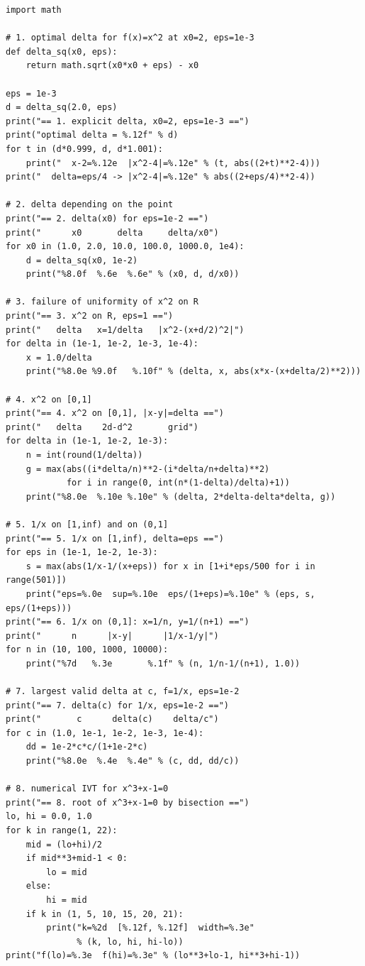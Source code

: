 \begin{lab}
\begin{verbatim}
import math

# 1. optimal delta for f(x)=x^2 at x0=2, eps=1e-3
def delta_sq(x0, eps):
    return math.sqrt(x0*x0 + eps) - x0

eps = 1e-3
d = delta_sq(2.0, eps)
print("== 1. explicit delta, x0=2, eps=1e-3 ==")
print("optimal delta = %.12f" % d)
for t in (d*0.999, d, d*1.001):
    print("  x-2=%.12e  |x^2-4|=%.12e" % (t, abs((2+t)**2-4)))
print("  delta=eps/4 -> |x^2-4|=%.12e" % abs((2+eps/4)**2-4))

# 2. delta depending on the point
print("== 2. delta(x0) for eps=1e-2 ==")
print("      x0       delta     delta/x0")
for x0 in (1.0, 2.0, 10.0, 100.0, 1000.0, 1e4):
    d = delta_sq(x0, 1e-2)
    print("%8.0f  %.6e  %.6e" % (x0, d, d/x0))

# 3. failure of uniformity of x^2 on R
print("== 3. x^2 on R, eps=1 ==")
print("   delta   x=1/delta   |x^2-(x+d/2)^2|")
for delta in (1e-1, 1e-2, 1e-3, 1e-4):
    x = 1.0/delta
    print("%8.0e %9.0f   %.10f" % (delta, x, abs(x*x-(x+delta/2)**2)))

# 4. x^2 on [0,1]
print("== 4. x^2 on [0,1], |x-y|=delta ==")
print("   delta    2d-d^2       grid")
for delta in (1e-1, 1e-2, 1e-3):
    n = int(round(1/delta))
    g = max(abs((i*delta/n)**2-(i*delta/n+delta)**2)
            for i in range(0, int(n*(1-delta)/delta)+1))
    print("%8.0e  %.10e %.10e" % (delta, 2*delta-delta*delta, g))

# 5. 1/x on [1,inf) and on (0,1]
print("== 5. 1/x on [1,inf), delta=eps ==")
for eps in (1e-1, 1e-2, 1e-3):
    s = max(abs(1/x-1/(x+eps)) for x in [1+i*eps/500 for i in range(501)])
    print("eps=%.0e  sup=%.10e  eps/(1+eps)=%.10e" % (eps, s, eps/(1+eps)))
print("== 6. 1/x on (0,1]: x=1/n, y=1/(n+1) ==")
print("      n      |x-y|      |1/x-1/y|")
for n in (10, 100, 1000, 10000):
    print("%7d   %.3e       %.1f" % (n, 1/n-1/(n+1), 1.0))

# 7. largest valid delta at c, f=1/x, eps=1e-2
print("== 7. delta(c) for 1/x, eps=1e-2 ==")
print("       c      delta(c)    delta/c")
for c in (1.0, 1e-1, 1e-2, 1e-3, 1e-4):
    dd = 1e-2*c*c/(1+1e-2*c)
    print("%8.0e  %.4e  %.4e" % (c, dd, dd/c))

# 8. numerical IVT for x^3+x-1=0
print("== 8. root of x^3+x-1=0 by bisection ==")
lo, hi = 0.0, 1.0
for k in range(1, 22):
    mid = (lo+hi)/2
    if mid**3+mid-1 < 0:
        lo = mid
    else:
        hi = mid
    if k in (1, 5, 10, 15, 20, 21):
        print("k=%2d  [%.12f, %.12f]  width=%.3e"
              % (k, lo, hi, hi-lo))
print("f(lo)=%.3e  f(hi)=%.3e" % (lo**3+lo-1, hi**3+hi-1))
\end{verbatim}
\end{lab}

